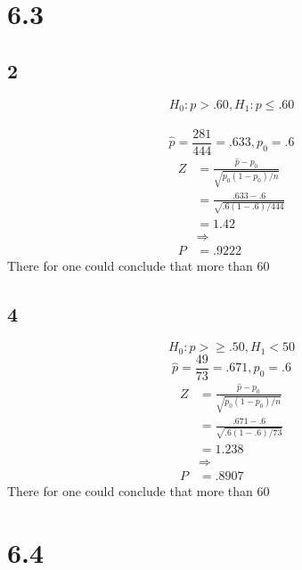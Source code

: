 \documentclass[12pt]{report}
\begin{document}
\section*{6.3}
\subsection*{2}
 $$H_0:p>.60, H_1:p\leq.60$$\\
 $$\hat{p}=\frac{281}{444}=.633,p_0=.6$$
 \begin{align*}
 Z&=\frac{\hat{p}-p_0}{\sqrt{p_0(1-p_0)/n}}\\
  &=\frac{.633-.6}{\sqrt{.6(1-.6)/444}}\\
  &=1.42\\
  &\Rightarrow\\
 P&=.9222
 \end{align*}
 There for one could conclude that more than 60%
\subsection*{4}
$$H_0:p>\geq.50,H_1<50$$
 $$\hat{p}=\frac{49}{73}=.671,p_0=.6$$
 \begin{align*}
 Z&=\frac{\hat{p}-p_0}{\sqrt{p_0(1-p_0)/n}}\\
  &=\frac{.671-.6}{\sqrt{.6(1-.6)/73}}\\
  &=1.238\\
  &\Rightarrow\\
 P&=.8907
 \end{align*}
  There for one could conclude that more than 60%
\section*{6.4}
\end{document}
